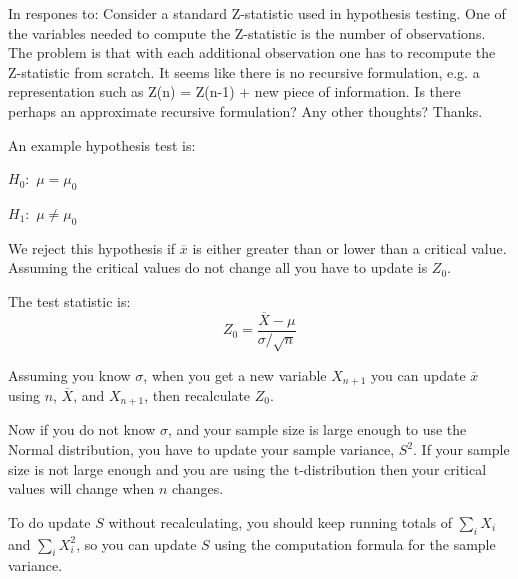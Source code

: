 \documentclass[12pt]{article}
\begin{document}
In respones to: Consider a standard Z-statistic used in hypothesis testing. One of the variables needed to compute the Z-statistic is the number of observations. The problem is that with each additional observation one has to recompute the Z-statistic from scratch. It seems like there is no recursive formulation, e.g. a representation such as
Z(n) = Z(n-1) + new piece of information. Is there perhaps an approximate recursive formulation? Any other thoughts?
Thanks. 

An example hypothesis test is:

$H_0:$ $\mu = \mu_0$

$H_1:$ $\mu \neq \mu_0$

We reject this hypothesis if $\overline{x}$ is either greater than or lower than a critical value.
Assuming the critical values do not change all you have to update is $Z_0$.

The test statistic is: 
$$ Z_0 = \frac{\overline{X} - \mu}{\sigma / \sqrt{n}}$$

Assuming you know $\sigma$, when you get a new variable $X_{n+1}$ you can update $\overline{x}$ 
using $n$, $\overline{X}$, and $X_{n+1}$, then recalculate $Z_0$.

Now if you do not know $\sigma$, and your sample size is large enough to use the Normal distribution, you have
to update your sample variance, $S^2$. If your sample size is not large enough and you are using the t-distribution then
your critical values will change when $n$ changes.

To do update $S$ without recalculating, you should keep running totals of $\sum_i X_i$ and $\sum_i X_i^2$,
so you can update $S$ using the computation formula for the sample variance.




\end{document}
